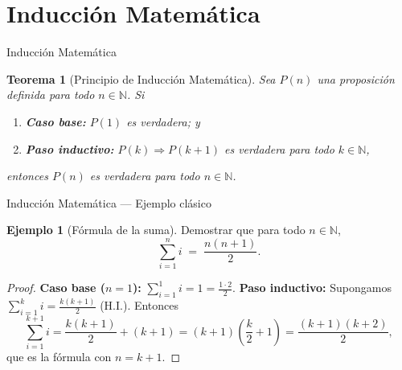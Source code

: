 \documentclass[10pt,aspectratio=169]{beamer}
\theoremstyle{definition}
\newtheorem{ejemplo}{Ejemplo}
\theoremstyle{plain}
\newtheorem{teorema}{Teorema}
\theoremstyle{remark}
\newcommand{\N}{\mathbb{N}}
\begin{document}
\section{Inducción Matemática}
\begin{frame}{Inducción Matemática}
  \begin{teorema}[Principio de Inducción Matemática]
    Sea $P(n)$ una proposición definida para todo $n\in\N$. Si
    \begin{enumerate}
      \item \textbf{Caso base:} $P(1)$ es verdadera; y
      \item \textbf{Paso inductivo:} $P(k)\Rightarrow P(k+1)$ es verdadera
            para todo $k\in\N$,
    \end{enumerate}
    entonces $P(n)$ es verdadera para todo $n\in\N$.
  \end{teorema}
  \vspace{0.3em}
  \begin{center}
  \end{center}
\end{frame}

\begin{frame}{Inducción Matemática — Ejemplo clásico}
  \begin{ejemplo}[Fórmula de la suma]
    Demostrar que para todo $n\in\N$,
    \[
      \sum_{i=1}^{n} i \;=\; \frac{n(n+1)}{2}.
    \]
  \end{ejemplo}
  \begin{proof}
    \textbf{Caso base ($n=1$):} $\displaystyle\sum_{i=1}^{1} i = 1
    = \frac{1\cdot 2}{2}$. \checkmark
    \vspace{0.3em}
    \textbf{Paso inductivo:} Supongamos $\displaystyle\sum_{i=1}^{k} i
    = \frac{k(k+1)}{2}$ (H.I.). Entonces
    \[
      \sum_{i=1}^{k+1} i
      = \frac{k(k+1)}{2} + (k+1)
      = (k+1)\!\left(\frac{k}{2}+1\right)
      = \frac{(k+1)(k+2)}{2},
    \]
    que es la fórmula con $n=k+1$. \checkmark
  \end{proof}
\end{frame}
\end{document}
